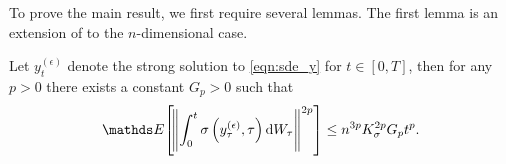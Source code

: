 To prove the main result, we first require several lemmas.
The first lemma is an extension of \cite[Lem. A.1]{Balasuriya_2020_StochasticSensitivityComputable} to the \(n\)-dimensional case.
\begin{lemma}\label{lem:sigma_specific}
	Let \(y_t^{(\epsilon)}\) denote the strong solution to \eqref{eqn:sde_y} for \(t \in [0,T]\), then for any \(p > 0\) there exists a constant \(G_p > 0\) such that
	\[
		\avg{\norm{\int_0^{t}{\sigma\left(y_\tau^{(\epsilon)}, \tau\right)\dif W_\tau}}^{2p}} \leq n^{3p} K_\sigma^{2p}G_p t^p.
	\]

\end{lemma}
